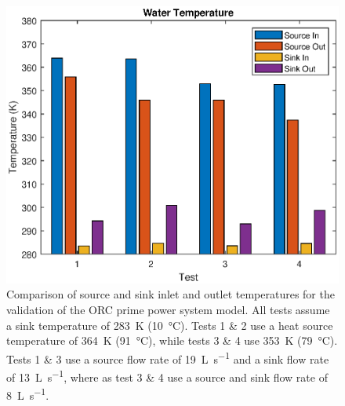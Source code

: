 \begin{figure}[h]
	\centering
	
	\includegraphics[width=\textwidth]{figures/VerificationWaterTemp01}
	
	\caption{Comparison of source and sink inlet and outlet temperatures for the validation of the ORC prime power system model. All tests assume a sink temperature of \SI{283}{\kelvin} (\SI{10}{\degreeCelsius}). Tests 1 \& 2 use a heat source temperature of \SI{364}{\kelvin} (\SI{91}{\degreeCelsius}), while tests 3 \& 4 use \SI{353}{\kelvin} (\SI{79}{\degreeCelsius}). Tests 1 \& 3 use a source flow rate of \SI{19}{\liter\per\second} and a sink flow rate of \SI{13}{\liter\per\second}, where as test 3 \& 4 use a source and sink flow rate of \SI{8}{\liter\per\second}.
	}
	\label{fig:verificationWaterTemp01}
\end{figure}
